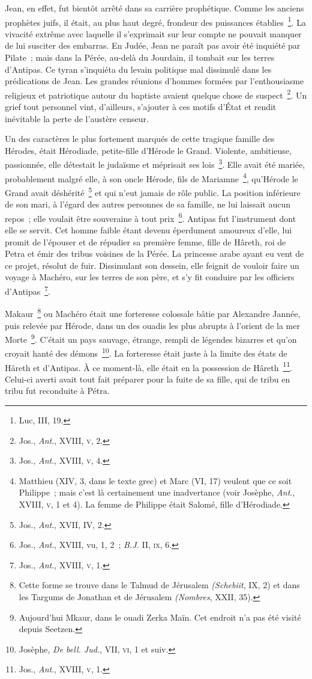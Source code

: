 \documentclass[french,twoside]{book} %
\begin{document}
Jean, en effet, fut bientôt arrêté dans sa carrière prophétique. Comme les anciens prophètes juifs, il était, au plus haut degré, frondeur des puissances établies \footnote{Luc, III, 19.}. La vivacité extrême avec laquelle il s’exprimait sur leur compte ne pouvait manquer de lui susciter des embarras. En Judée, Jean ne paraît pas avoir été inquiété par Pilate ; mais dans la Pérée, au-delà du Jourdain, il tombait sur les terres d’Antipas. Ce tyran s’inquiéta du levain politique mal dissimulé dans les prédications de Jean. Les grandes réunions d’hommes formées par l’enthousiasme religieux et patriotique autour du baptiste avaient quelque chose de suspect \footnote{ Jos., {\itshape Ant}., XVIII, \textsc{v}, 2.}. Un grief tout personnel vint, d’ailleurs, s’ajouter à ces motifs d’État et rendit inévitable la perte de l’austère censeur.\par
Un des caractères le plus fortement marqués de cette tragique famille des Hérodes, était Hérodiade, petite-fille d’Hérode le Grand. Violente, ambitieuse, passionnée, elle détestait le judaïsme et méprisait ses lois \footnote{ Jos., {\itshape Ant}., XVIII, \textsc{v}, 4.}. Elle avait été mariée, probablement malgré elle, à son oncle Hérode, fils de Mariamne \footnote{ Matthieu (XIV, 3, dans le texte grec) et Marc (VI, 17) veulent que ce soit Philippe ; mais c’est là certainement une inadvertance (voir Josèphe, {\itshape Ant}., XVIII, \textsc{v}, 1 et 4). La femme de Philippe était Salomé, fille d’Hérodiade.}, qu’Hérode le Grand avait déshérité \footnote{ Jos., {\itshape Ant}., XVII, IV, 2.} et qui n’eut jamais de rôle public. La position inférieure de son mari, à l’égard des autres personnes de sa famille, ne lui laissait aucun repos ; elle voulait être souveraine à tout prix \footnote{ Jos., {\itshape Ant}., XVIII, vu, 1, 2 ; {\itshape B.J.} II, \textsc{ix}, 6.}. Antipas fut l’instrument dont elle se servit. Cet homme faible étant devenu éperdument amoureux d’elle, lui promit de l’épouser et de répudier sa première femme, fille de Hâreth, roi de Petra et émir des tribus voisines de la Pérée. La princesse arabe ayant eu vent de ce projet, résolut de fuir. Dissimulant son dessein, elle feignit de vouloir faire un voyage à Machéro, sur les terres de son père, et s’y fit conduire par les officiers d’Antipas \footnote{ Jos., {\itshape Ant}., XVIII, \textsc{v}, 1.}.\par
Makaur \footnote{ Cette forme se trouve dans le Talmud de Jérusalem {\itshape (Schebiit}, IX, 2) et dans les Targums de Jonathan et de Jérusalem {\itshape (Nombres}, XXII, 35).} ou Machéro était une forteresse colossale bâtie par Alexandre Jannée, puis relevée par Hérode, dans un des ouadis les plus abrupts à l’orient de la mer Morte \footnote{Aujourd’hui Mkaur, dans le ouadi Zerka Maïn. Cet endroit n’a pas été visité depuis Seetzen.}. C’était un pays sauvage, étrange, rempli de légendes bizarres et qu’on croyait hanté des démons \footnote{ Josèphe, {\itshape De bell. Jud.}, VII, \textsc{vi}, 1 et suiv.}. La forteresse était juste à la limite des états de Hâreth et d’Antipas. À ce moment-là, elle était en la possession de Hâreth \footnote{ Jos., {\itshape Ant}., XVIII, \textsc{v}, 1.}. Celui-ci averti avait tout fait préparer pour la fuite de sa fille, qui de tribu en tribu fut reconduite à Pétra.\par
\end{document}
